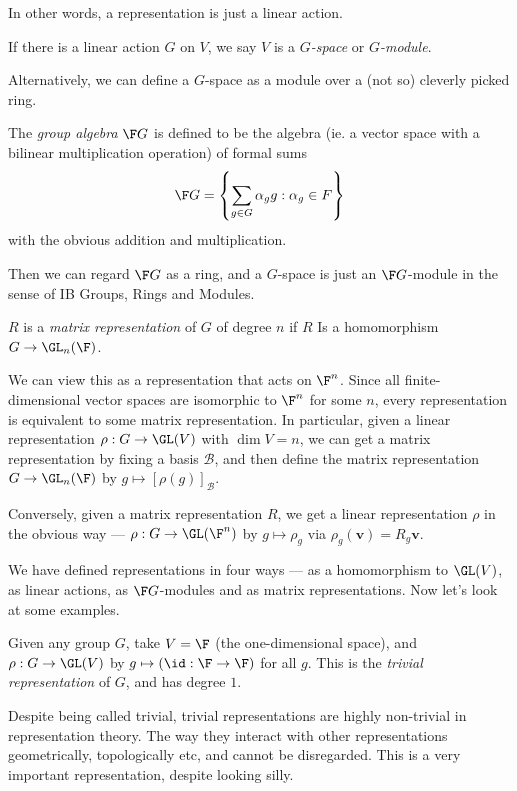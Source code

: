 \documentclass[a4paper]{article}
\begin{document}
In other words, a representation is just a linear action.

\begin{defi}
  If there is a linear action $G$ on $V$, we say $V$ is a \emph{$G$-space} or \emph{$G$-module}.
\end{defi}

Alternatively, we can define a $G$-space as a module over a (not so) cleverly picked ring.
\begin{defi}
  The \emph{group algebra} $\F G$ is defined to be the algebra (ie. a vector space with a bilinear multiplication operation) of formal sums
  \[
    \F G = \left\{ \sum_{g \in G} \alpha_g g: \alpha_g \in F\right\}
  \]
  with the obvious addition and multiplication.
\end{defi}
Then we can regard $\F G$ as a ring, and a $G$-space is just an $\F G$-module in the sense of IB Groups, Rings and Modules.

\begin{defi}
  $R$ is a \emph{matrix representation} of $G$ of degree $n$ if $R$ Is a homomorphism $G \to \GL_n(\F)$.
\end{defi}
We can view this as a representation that acts on $\F^n$. Since all finite-dimensional vector spaces are isomorphic to $\F^n$ for some $n$, every representation is equivalent to some matrix representation. In particular, given a linear representation $\rho: G \to \GL(V)$ with $\dim V = n$, we can get a matrix representation by fixing a basis $\mathcal{B}$, and then define the matrix representation $G \to \GL_n(\F)$ by $g \mapsto [\rho(g)]_{\mathcal{B}}$.

Conversely, given a matrix representation $R$, we get a linear representation $\rho$ in the obvious way --- $\rho: G \to \GL(\F^n)$ by $g \mapsto \rho_g$ via $\rho_g(\mathbf{v}) = R_g \mathbf{v}$.

We have defined representations in four ways --- as a homomorphism to $\GL(V)$, as linear actions, as $\F G$-modules and as matrix representations. Now let's look at some examples.

\begin{eg}
  Given any group $G$, take $V = \F$ (the one-dimensional space), and $\rho: G \to \GL(V)$ by $g \mapsto (\id: \F \to \F)$ for all $g$. This is the \emph{trivial representation} of $G$, and has degree $1$.
\end{eg}
Despite being called trivial, trivial representations are highly non-trivial in representation theory. The way they interact with other representations geometrically, topologically etc, and cannot be disregarded. This is a very important representation, despite looking silly.
\end{document}
